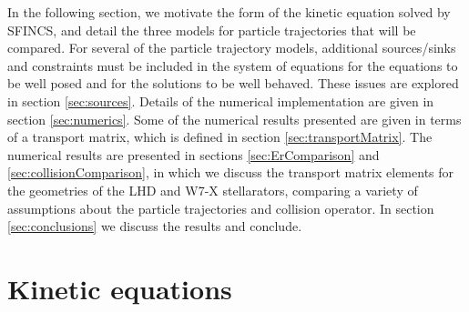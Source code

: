 \documentclass[12pt]{revtex4}
\begin{document}
In the following section, we motivate the form of the kinetic equation solved by SFINCS,
and detail the three models for particle trajectories that will be compared.
For several of the particle trajectory models,
additional sources/sinks and constraints must be included in the system of equations
for the equations to be well posed and for the solutions to be well behaved.
These issues are explored in section \ref{sec:sources}.
Details of the numerical implementation are given in section \ref{sec:numerics}.
Some of the numerical results presented are given in terms of a transport
matrix, which is defined in section \ref{sec:transportMatrix}.
The numerical results are presented in sections \ref{sec:ErComparison} and \ref{sec:collisionComparison},
in which we discuss the transport matrix elements for the geometries of the LHD and W7-X
stellarators, comparing a variety of assumptions about the particle trajectories and collision operator.
In section \ref{sec:conclusions} we discuss the results and conclude.

\section{Kinetic equations}
\label{sec:equations}
\end{document}
